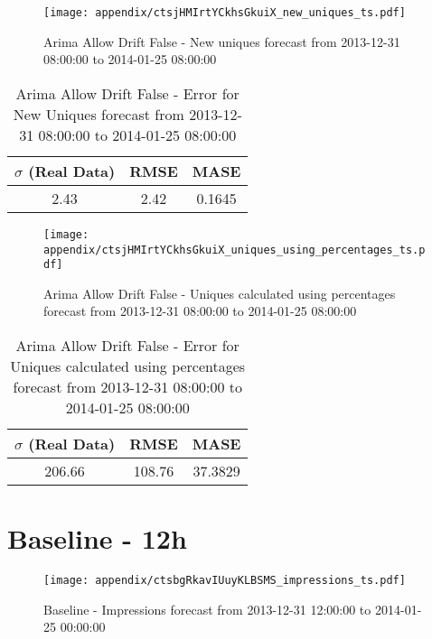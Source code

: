 \begin{figure}[H] \begin{center} \leavevmode
\texttt{[image: appendix/ctsjHMIrtYCkhsGkuiX\_new\_uniques\_ts.pdf]} \caption{
Arima Allow Drift False - New uniques forecast from 2013-12-31 08:00:00 to 2014-01-25 08:00:00} \label{fig:appendix/ctsjHMIrtYCkhsGkuiX_new_uniques_ts.pdf} \end{center}
\end{figure}

\begin{table}[H]
\centering
\footnotesize
\begin{tabular}{ccc}
$\sigma$ (Real Data) & RMSE & MASE   \\ \hline
2.43 & 2.42 & 0.1645 \\
\end{tabular}

\vspace{0.5cm}

\caption{
Arima Allow Drift False - Error for New Uniques forecast from 2013-12-31 08:00:00 to 2014-01-25 08:00:00}
\end{table}

\begin{figure}[H] \begin{center} \leavevmode
\texttt{[image: appendix/ctsjHMIrtYCkhsGkuiX\_uniques\_using\_percentages\_ts.pdf]} \caption{
Arima Allow Drift False - Uniques calculated using percentages forecast from 2013-12-31 08:00:00 to 2014-01-25 08:00:00} \label{fig:appendix/ctsjHMIrtYCkhsGkuiX_uniques_using_percentages_ts.pdf} \end{center}
\end{figure}

\begin{table}[H]
\centering
\footnotesize
\begin{tabular}{ccc}
$\sigma$ (Real Data) & RMSE & MASE   \\ \hline
206.66 & 108.76 & 37.3829 \\
\end{tabular}

\vspace{0.5cm}

\caption{
Arima Allow Drift False - Error for Uniques calculated using percentages forecast from 2013-12-31 08:00:00 to 2014-01-25 08:00:00}
\end{table}

\section{Baseline - 12h}
\begin{figure}[H] \begin{center} \leavevmode
\texttt{[image: appendix/ctsbgRkavIUuyKLBSMS\_impressions\_ts.pdf]} \caption{
Baseline - Impressions forecast from 2013-12-31 12:00:00 to 2014-01-25 00:00:00} \label{fig:appendix/ctsbgRkavIUuyKLBSMS_impressions_ts.pdf} \end{center}
\end{figure}


